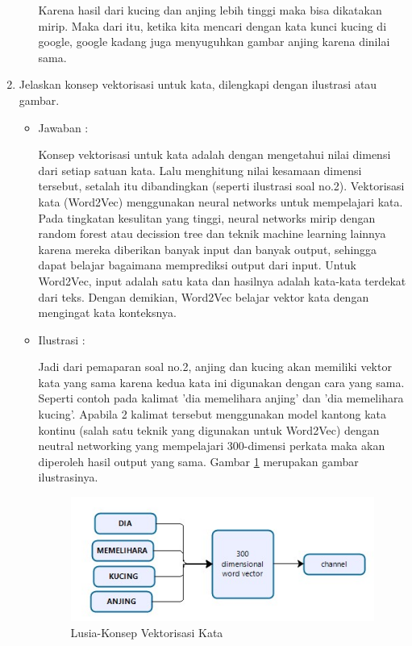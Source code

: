 \begin{enumerate}
\begin{itemize}
		\par Karena hasil dari kucing dan anjing lebih tinggi maka bisa dikatakan  mirip. Maka dari itu, ketika kita mencari dengan kata kunci kucing di google, google kadang juga menyuguhkan gambar anjing karena dinilai sama.
	\end{itemize}

\item Jelaskan konsep vektorisasi untuk kata, dilengkapi dengan ilustrasi atau gambar.
	\begin{itemize}
	\item Jawaban :
		\par Konsep vektorisasi untuk kata adalah dengan mengetahui nilai dimensi dari setiap satuan kata. Lalu menghitung nilai kesamaan dimensi tersebut, setalah itu dibandingkan (seperti ilustrasi soal no.2). Vektorisasi kata (Word2Vec) menggunakan neural networks untuk mempelajari kata. Pada tingkatan kesulitan yang tinggi, neural networks mirip dengan random forest atau decission tree dan teknik machine learning lainnya karena mereka diberikan banyak input dan banyak output, sehingga dapat belajar bagaimana memprediksi output dari input. Untuk Word2Vec, input adalah satu kata dan hasilnya adalah kata-kata terdekat dari teks. Dengan demikian, Word2Vec belajar vektor kata dengan mengingat kata konteksnya.
	\item Ilustrasi :
		\par Jadi dari pemaparan soal no.2, anjing dan kucing akan memiliki vektor kata yang sama karena kedua kata ini digunakan dengan cara yang sama. Seperti contoh pada kalimat 'dia memelihara anjing' dan 'dia memelihara kucing'. Apabila 2 kalimat tersebut menggunakan model kantong kata kontinu (salah satu teknik yang digunakan untuk Word2Vec) dengan neutral networking yang mempelajari 300-dimensi perkata maka akan diperoleh hasil output yang sama. Gambar \ref{5a4} merupakan gambar ilustrasinya.
			\begin{figure}[!hbtp]
			\centering
			\includegraphics[scale=0.5]{figures/p3.jpg}
			\caption{Lusia-Konsep Vektorisasi Kata}
			\label{5a4}
			\end{figure}
	\end{itemize}


\end{enumerate}
